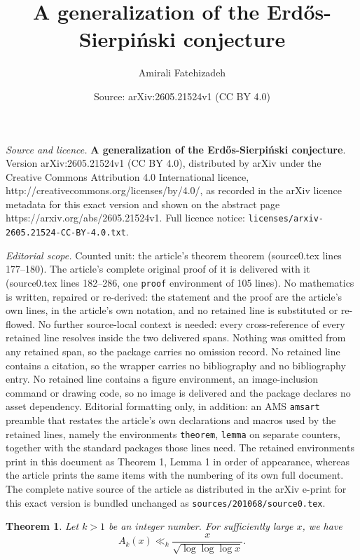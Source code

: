 \documentclass[10pt,a4paper]{amsart}
\title{\textbf{A generalization of the Erdős-Sierpiński conjecture}}
\author{Amirali Fatehizadeh}
\date{Source: arXiv:2605.21524v1 (CC BY 4.0)}
\newtheorem{theorem}{Theorem}
\begin{document}
\maketitle

\noindent\emph{Source and licence.} \textbf{A generalization of the Erdős-Sierpiński conjecture}. Version arXiv:2605.21524v1 (CC BY 4.0), distributed by arXiv under the Creative Commons Attribution 4.0 International licence, http://creativecommons.org/licenses/by/4.0/, as recorded in the arXiv licence metadata for this exact version and shown on the abstract page https://arxiv.org/abs/2605.21524v1. Full licence notice: \texttt{licenses/arxiv-2605.21524-CC-BY-4.0.txt}.\par\smallskip

\noindent\textit{Editorial scope.} Counted unit: the article's theorem theorem (source0.tex lines 177--180). The article's complete original proof of it is delivered with it (source0.tex lines 182--286, one \texttt{proof} environment of 105 lines). No mathematics is written, repaired or re-derived: the statement and the proof are the article's own lines, in the article's own notation, and no retained line is substituted or re-flowed.  No further source-local context is needed: every cross-reference of every retained line resolves inside the two delivered spans.  Nothing was omitted from any retained span, so the package carries no omission record.  No retained line contains a citation, so the wrapper carries no bibliography and no bibliography entry.  No retained line contains a figure environment, an image-inclusion command or drawing code, so no image is delivered and the package declares no asset dependency.  Editorial formatting only, in addition: an AMS \texttt{amsart} preamble that restates the article's own declarations and macros used by the retained lines, namely the environments \texttt{theorem}, \texttt{lemma} on separate counters, together with the standard packages those lines need.  The retained environments print in this document as Theorem 1, Lemma 1 in order of appearance, whereas the article prints the same items with the numbering of its own full document.  The complete native source of the article as distributed in the arXiv e-print for this exact version is bundled unchanged as \texttt{sources/201068/source0.tex}.
\begin{theorem}
Let $k > 1$ be an integer number. For sufficiently large $x$, we have
\[ A_k(x) \ll_k \frac{x}{\sqrt{\log \log \log x}}. \]
\end{theorem}
\end{document}
